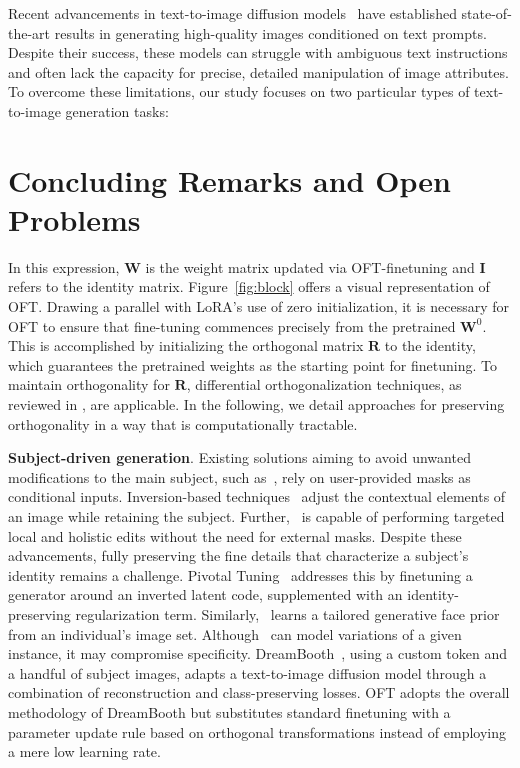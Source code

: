 Recent advancements in text-to-image diffusion models~\cite{saharia2022photorealistic,ramesh2022hierarchical,rombach2022high} have established state-of-the-art results in generating high-quality images conditioned on text prompts. Despite their success, these models can struggle with ambiguous text instructions and often lack the capacity for precise, detailed manipulation of image attributes. To overcome these limitations, our study focuses on two particular types of text-to-image generation tasks:

\section{Concluding Remarks and Open Problems}

In this expression, $\bm{W}$ is the weight matrix updated via OFT-finetuning and $\bm{I}$ refers to the identity matrix. Figure~\ref{fig:block} offers a visual representation of OFT. Drawing a parallel with LoRA’s use of zero initialization, it is necessary for OFT to ensure that fine-tuning commences precisely from the pretrained $\bm{W}^0$. This is accomplished by initializing the orthogonal matrix $\bm{R}$ to the identity, which guarantees the pretrained weights as the starting point for finetuning. To maintain orthogonality for $\bm{R}$, differential orthogonalization techniques, as reviewed in \cite{liu2021orthogonal,lezcano2019cheap}, are applicable. In the following, we detail approaches for preserving orthogonality in a way that is computationally tractable.

\textbf{Subject-driven generation}. Existing solutions aiming to avoid unwanted modifications to the main subject, such as~\cite{avrahami2022blended,nichol2022glide}, rely on user-provided masks as conditional inputs. Inversion-based techniques~\cite{choi2021ilvr,dhariwal2021diffusion,ramesh2022hierarchical,gal2022image} adjust the contextual elements of an image while retaining the subject. Further,~\cite{hertz2022prompt} is capable of performing targeted local and holistic edits without the need for external masks. Despite these advancements, fully preserving the fine details that characterize a subject’s identity remains a challenge. Pivotal Tuning~\cite{roich2022pivotal} addresses this by finetuning a generator around an inverted latent code, supplemented with an identity-preserving regularization term. Similarly,~\cite{nitzan2022mystyle} learns a tailored generative face prior from an individual's image set. Although~\cite{casanova2021instance} can model variations of a given instance, it may compromise specificity. DreamBooth~\cite{ruiz2023dreambooth}, using a custom token and a handful of subject images, adapts a text-to-image diffusion model through a combination of reconstruction and class-preserving losses. OFT adopts the overall methodology of DreamBooth but substitutes standard finetuning with a parameter update rule based on orthogonal transformations instead of employing a mere low learning rate.

